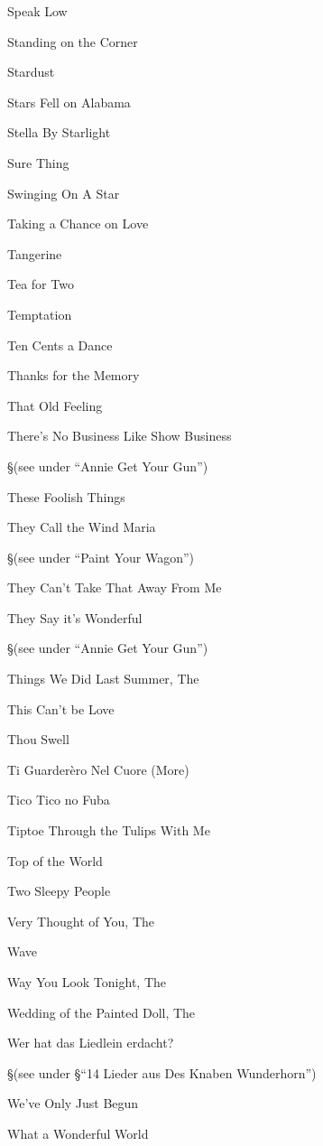\N Speak Low


\N Standing on the Corner


\N Stardust


\N Stars Fell on Alabama


\N Stella By Starlight


\N Sure Thing


\N Swinging On A Star


\N Taking a Chance on Love


\N Tangerine


\N Tea for Two


\N Temptation


\N Ten Cents a Dance


\N Thanks for the Memory


\N That Old Feeling


\N There's No Business Like Show Business

\nobreak
\S (see under ``Annie Get Your Gun'')

\N These Foolish Things


\N They Call the Wind Maria

\nobreak
\S (see under ``Paint Your Wagon'')

\N They Can't Take That Away From Me


\N They Say it's Wonderful

\nobreak
\S (see under ``Annie Get Your Gun'')

\N Things We Did Last Summer, The


\N This Can't be Love


\N Thou Swell


\N Ti Guarder{\`e}ro Nel Cuore (More)


\N Tico Tico no Fuba


\N Tiptoe Through the Tulips With Me


\N Top of the World


\N Two Sleepy People


\N Very Thought of You, The


\N Wave


\N Way You Look Tonight, The


\N Wedding of the Painted Doll, The


\N Wer hat das Liedlein erdacht?

\nobreak
\S (see under
\S ``14 Lieder aus Des Knaben Wunderhorn'')

\N We've Only Just Begun


\N What a Wonderful World


